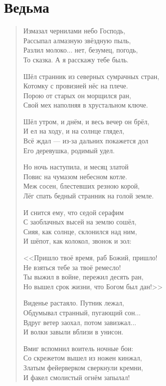 \documentclass[a4paper,12pt,fleqn]{book}\usepackage{polyglossia}\setdefaultlanguage[babelshorthands=true]{russian}\setotherlanguage{english}\defaultfontfeatures{Ligatures=TeX,Mapping=tex-text}\usepackage{xcolor}\newcommand{\ml}[3]{#2}
\begin{document}
\section{Ведьма}

\begin{verse}
Измазал чернилами небо Господь,\\
Рассыпал алмазную звёздную пыль,\\
Разлил молоко... нет, безумец, погодь,\\
То сказка. А я расскажу тебе быль.

Шёл странник из северных сумрачных стран,\\
Котомку с провизией нёс на плече.\\
Порою от старых он морщился ран,\\
Свой мех наполняя в хрустальном ключе.

Шёл утром, и днём, и весь вечер он брёл,\\
И ел на ходу, и на солнце глядел,\\
Всё ждал --- из-за дальних покажется дол\\
Его деревушка, родимый удел.

Но ночь наступила, и месяц златой\\
Повис на чумазом небесном котле.\\
Меж сосен, блестевших резною корой,\\
Лёг спать бедный странник на голой земле.

И снится ему, что седой серафим\\
С заоблачных высей на землю сошёл,\\
Сияя, как солнце, склонился над ним,\\
И шёпот, как колокол, звонок и зол:

<<Пришло твоё время, раб Божий, пришло!\\
Не взяться тебе за твоё ремесло!\\
Ты выжил в войне, пережил десять ран,\\
Но вышел срок жизни, что Богом был дан!>>

Виденье растаяло. Путник лежал,\\
Обдумывал странный, пугающий сон...\\
Вдруг ветер заохал, потом завизжал...\\
И волки завыли вблизи в унисон.

Вмиг вспомнил воитель ночные бои:\\
Со скрежетом вышел из ножен кинжал,\\
Златым фейерверком сверкнули кремни,\\ 
И факел смолистый огнём запылал!


\end{verse}
\end{document}
